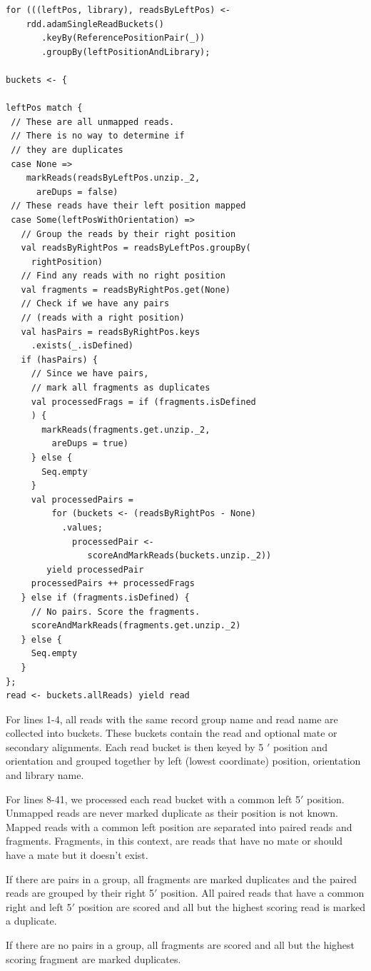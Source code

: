 \documentclass[10pt,twocolumn]{article}
\theoremstyle{plain}
\begin{document}
\begin{lstlisting}
for (((leftPos, library), readsByLeftPos) <- 
    rdd.adamSingleReadBuckets()
       .keyBy(ReferencePositionPair(_))
       .groupBy(leftPositionAndLibrary);

buckets <- {

leftPos match {
 // These are all unmapped reads. 
 // There is no way to determine if
 // they are duplicates
 case None =>
    markReads(readsByLeftPos.unzip._2,
      areDups = false)
 // These reads have their left position mapped
 case Some(leftPosWithOrientation) =>
   // Group the reads by their right position
   val readsByRightPos = readsByLeftPos.groupBy(
     rightPosition)
   // Find any reads with no right position
   val fragments = readsByRightPos.get(None)
   // Check if we have any pairs
   // (reads with a right position)
   val hasPairs = readsByRightPos.keys
     .exists(_.isDefined)
   if (hasPairs) {
     // Since we have pairs,
     // mark all fragments as duplicates
     val processedFrags = if (fragments.isDefined
     ) {
       markReads(fragments.get.unzip._2,
         areDups = true)
     } else {
       Seq.empty
     }
     val processedPairs = 
         for (buckets <- (readsByRightPos - None)
           .values;
             processedPair <- 
                scoreAndMarkReads(buckets.unzip._2)) 
        yield processedPair
     processedPairs ++ processedFrags
   } else if (fragments.isDefined) {
     // No pairs. Score the fragments.
     scoreAndMarkReads(fragments.get.unzip._2)
   } else {
     Seq.empty
   }
};
read <- buckets.allReads) yield read
\end{lstlisting}

For lines 1-4, all reads with the same record group name and read name are collected 
into buckets. These buckets contain the read and optional mate or secondary alignments.
Each read bucket is then keyed by 5 $'$ position and orientation and grouped together by
left (lowest coordinate) position, orientation and library name.

For lines 8-41, we processed each read bucket with a common left 5$'$ position. Unmapped
reads are never marked duplicate as their position is not known. Mapped reads with a common
left position are separated into paired reads and fragments. Fragments, in this context,
are reads that have no mate or should have a mate but it doesn't exist.

If there are pairs in a group, all fragments are marked duplicates and the paired reads are grouped
by their right 5$'$ position. All paired reads that have a common right and left 5$'$
position are scored and all but the highest scoring read is marked a duplicate.

If there are no pairs in a group, all fragments are scored and all but the highest scoring fragment
are marked duplicates.






\clearpage
\end{document}
